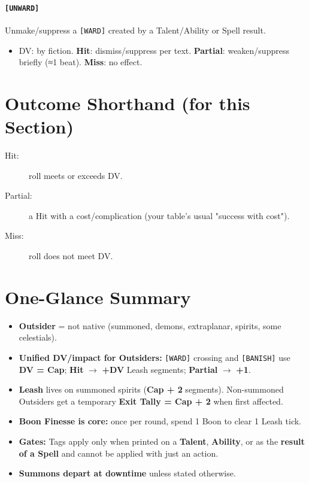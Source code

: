 \documentclass[11pt]{article}
\begin{document}
\paragraph{\texttt{[UNWARD]}} Unmake/suppress a \texttt{[WARD]} created by a Talent/Ability or Spell result.
\begin{itemize}
  \item DV: by fiction. \textbf{Hit}: dismiss/suppress per text. \textbf{Partial}: weaken/suppress briefly (≈1 beat). \textbf{Miss}: no effect.
\end{itemize}
\bigskip

\section{Outcome Shorthand (for this Section)}

\begin{description}
  \item[Hit:] roll meets or exceeds DV.
  \item[Partial:] a Hit with a cost/complication (your table's usual "success with cost").
  \item[Miss:] roll does not meet DV.
\end{description}

\bigskip

\section{One-Glance Summary}

\begin{itemize}
  \item \textbf{Outsider} = not native (summoned, demons, extraplanar, spirits, some celestials).
  \item \textbf{Unified DV/impact for Outsiders:} \texttt{[WARD]} crossing and \texttt{[BANISH]} use \textbf{DV = Cap}; \textbf{Hit} $\rightarrow$ \textbf{+DV} Leash segments; \textbf{Partial} $\rightarrow$ \textbf{+1}.
  \item \textbf{Leash} lives on summoned spirits (\textbf{Cap + 2} segments). Non-summoned Outsiders get a temporary \textbf{Exit Tally = Cap + 2} when first affected.
  \item \textbf{Boon Finesse is core:} once per round, spend 1 Boon to clear 1 Leash tick.
  \item \textbf{Gates:} Tags apply only when printed on a \textbf{Talent}, \textbf{Ability}, or as the \textbf{result of a Spell} and cannot be applied with just an action.
  \item \textbf{Summons depart at downtime} unless stated otherwise.
\end{itemize}
\end{document}

